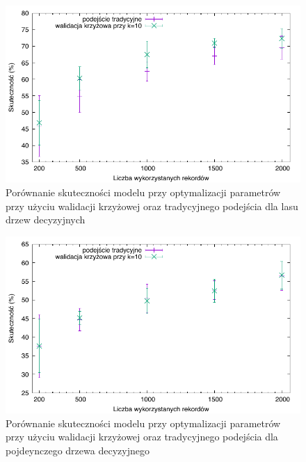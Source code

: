 \begin{figure}
\centering
\includegraphics[scale=\cvsize]{res/cv_forest.pdf}
\caption[Caption for LOF]{Porównanie skuteczności modelu przy optymalizacji parametrów przy użyciu walidacji krzyżowej oraz tradycyjnego podejścia dla lasu drzew decyzyjnych\label{cv_forest}}
\end{figure}

\begin{figure}
\centering
\includegraphics[scale=\cvsize]{res/cv_tree.pdf}
\caption[Caption for LOF]{Porównanie skuteczności modelu przy optymalizacji parametrów przy użyciu walidacji krzyżowej oraz tradycyjnego podejścia dla pojdeynczego drzewa decyzyjnego\label{cv_tree}}
\end{figure}
  


